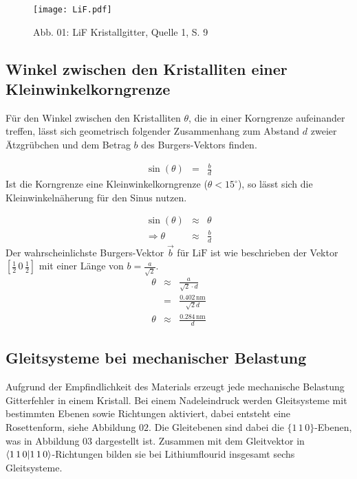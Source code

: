 \documentclass[12pt,a4paper]{scrartcl}
\numberwithin{equation}{section} %
\renewcommand{\[}{} %
\renewcommand{\]}{\noindent} %
\begin{document}
\begin{figure}
\centering
\texttt{[image: LiF.pdf]}
\caption{Abb. 01: LiF Kristallgitter, Quelle 1, S. 9}
\end{figure}

\hypertarget{winkel-zwischen-den-kristalliten-einer-kleinwinkelkorngrenze}{%
\subsection{Winkel zwischen den Kristalliten einer
Kleinwinkelkorngrenze}\label{winkel-zwischen-den-kristalliten-einer-kleinwinkelkorngrenze}}

Für den Winkel zwischen den Kristalliten \(\theta\), die in einer
Korngrenze aufeinander treffen, lässt sich geometrisch folgender
Zusammenhang zum Abstand \(d\) zweier Ätzgrübchen und dem Betrag \(b\)
des Burgers-Vektors finden.

\[
\begin{eqnarray}
    \sin(\theta) &=& \frac{b}{d}
\end{eqnarray}
\] Ist die Korngrenze eine Kleinwinkelkorngrenze
(\(\theta < 15^\circ\)), so lässt sich die Kleinwinkelnäherung für den
Sinus nutzen.

\[
\begin{eqnarray}
    \sin(\theta) &\approx& \theta \\
    \Rightarrow \theta &\approx& \frac{b}{d}
\end{eqnarray}
\] Der wahrscheinlichste Burgers-Vektor \(\vec{b}\) für \(\mathrm{LiF}\)
ist wie beschrieben der Vektor \([\frac{1}{2}\,0\,\frac{1}{2}]\) mit
einer Länge von \(b = \frac{a}{\sqrt{2}}\). \[
\begin{eqnarray}
    \theta &\approx& \frac{a}{\sqrt{2} \cdot d} \\
        &=& \frac{0.402\,\mathrm{nm}}{\sqrt{2} d}\\
    \theta &\approx& \frac{0.284\,\mathrm{nm}}{d} \label{theta}
\end{eqnarray}
\]

\hypertarget{gleitsysteme-bei-mechanischer-belastung}{%
\subsection{Gleitsysteme bei mechanischer
Belastung}\label{gleitsysteme-bei-mechanischer-belastung}}

Aufgrund der Empfindlichkeit des Materials erzeugt jede mechanische
Belastung Gitterfehler in einem Kristall. Bei einem Nadeleindruck werden
Gleitsysteme mit bestimmten Ebenen sowie Richtungen aktiviert, dabei
entsteht eine Rosettenform, siehe Abbildung \(02\). Die Gleitebenen sind
dabei die \(\lbrace1\,1\,0\rbrace\)-Ebenen, was in Abbildung \(03\)
dargestellt ist. Zusammen mit dem Gleitvektor in
\(\braket{1\,1\,0}\)-Richtungen bilden sie bei Lithiumflourid insgesamt
sechs Gleitsysteme.
\end{document}

